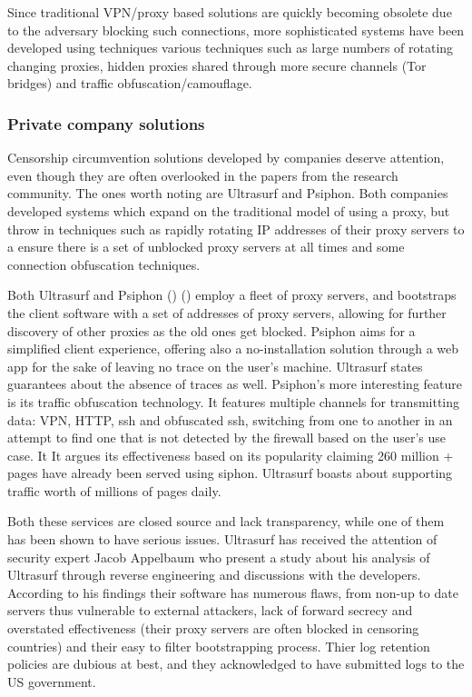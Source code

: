 \documentclass[11pt]{article} %
\begin{document}
Since traditional VPN/proxy based solutions are quickly becoming obsolete due to the adversary blocking such connections, more sophisticated systems have been developed using techniques various techniques such as large numbers of rotating changing proxies, hidden proxies shared through more secure channels (Tor bridges) and traffic obfuscation/camouflage.

\subsubsection{Private company solutions}
Censorship circumvention solutions developed by companies deserve attention, even though they are often overlooked in the papers from the research community. The ones worth noting are Ultrasurf and Psiphon. Both companies developed systems which expand on the traditional model of using a proxy, but throw in techniques such as rapidly rotating IP addresses of their proxy servers to a ensure there is a set of unblocked proxy servers at all times and some connection obfuscation techniques.

Both Ultrasurf and Psiphon (\citep*{ultrareach}) (\citep*{psiphon}) employ a fleet of proxy servers, and bootstraps the client software with a set of addresses of proxy servers, allowing for further discovery of other proxies as the old ones get blocked. Psiphon aims for a simplified client experience, offering also a no-installation solution through a web app for the sake of leaving no trace on the user’s machine. Ultrasurf states guarantees about the absence of traces as well. Psiphon’s  more interesting feature is its traffic obfuscation technology. It features multiple channels for transmitting data: VPN, HTTP, ssh and obfuscated ssh, switching from one to another in an attempt to find one that is not detected by the firewall based on the user’s use case.  It It argues its effectiveness based on its popularity claiming 260 million + pages have already been served using siphon. Ultrasurf boasts about supporting traffic worth of millions of pages daily.

Both these services are closed source and lack transparency, while one of them has been shown to have serious issues. Ultrasurf has received the attention of security expert Jacob Appelbaum who present a study \citep*{ultrasurfSucks} about his analysis of Ultrasurf through reverse engineering and discussions with the developers. According to his findings their software has numerous flaws, from non-up to date servers thus vulnerable to external attackers, lack of forward secrecy and overstated effectiveness (their proxy servers are often blocked in censoring countries) and their easy to filter bootstrapping process. Thier log retention policies are dubious at best, and they acknowledged to have submitted logs to the US government. 
\end{document}

